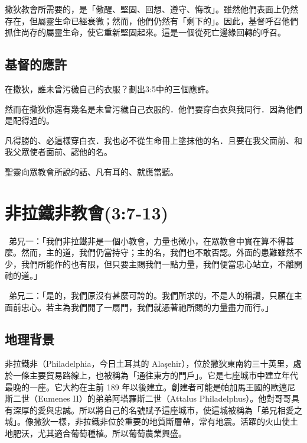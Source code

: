 撒狄教會所需要的，是「儆醒、堅固、回想、遵守、悔改」。雖然他們表面上仍然存在，但屬靈生命已經衰微；然而，他們仍然有「剩下的」。因此，基督呼召他們抓住尚存的屬靈生命，使它重新堅固起來。這是一個從死亡邊緣回轉的呼召。

\subsection{基督的應許}

\begin{ScriptureBox2}{在撒狄，誰未曾污穢自己的衣服？劃出3:5中的三個應許。}

\item[3:4] 然而在撒狄你還有幾名是未曾污穢自己衣服的．他們要穿白衣與我同行．因為他們是配得過的。

\item[3:5] 凡得勝的、必這樣穿白衣．我也必不從生命冊上塗抹他的名．且要在我父面前、和我父眾使者面前、認他的名。

\item[3:6] 聖靈向眾教會所說的話、凡有耳的、就應當聽。

\end{ScriptureBox2}

\section{非拉鐵非教會(3:7-13)}


\begin{DialogueBox}
\noindent\faUser\ 弟兄一：「我們非拉鐵非是一個小教會，力量也微小，在眾教會中實在算不得甚麼。然而，主的道，我們仍當持守；主的名，我們也不敢否認。外面的患難雖然不少，我們所能作的也有限，但只要主賜我們一點力量，我們便當忠心站立，不離開祂的道。」

\noindent\faUser\ 弟兄二：「是的，我們原沒有甚麼可誇的。我們所求的，不是人的稱讚，只願在主面前忠心。若主為我們開了一扇門，我們就憑著祂所賜的力量盡力而行。」
\end{DialogueBox}


\subsection{地理背景}
非拉鐵非（Philadelphia，今日土耳其的 Alaşehir），位於撒狄東南約三十英里，處於一條主要貿易路線上，也被稱為「通往東方的門戶」。它是七座城市中建立年代最晚的一座。它大約在主前 189 年以後建立。創建者可能是帕加馬王國的歐邁尼斯二世（Eumenes II）的弟弟阿塔羅斯二世（Attalus Philadelphus）。他對哥哥具有深厚的愛與忠誠。所以將自己的名號賦予這座城市，使這城被稱為「弟兄相愛之城」。像撒狄一樣，非拉鐵非位於重要的地質斷層帶，常有地震。活躍的火山使土地肥沃，尤其適合葡萄種植。所以葡萄農業興盛。

